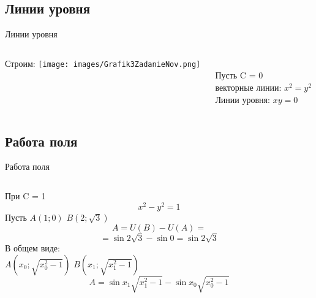 
\subsection{Линии уровня}
\begin{frame}{Линии уровня}
\begin{columns}
\begin{column}{0.4\paperwidth}
\centering
Строим:
\vspace{5mm}
\texttt{[image: images/Grafik3ZadanieNov.png]}
\end{column}
\begin{column}{0.4\paperwidth}
\centering
\vspace{20mm} \\
Пусть C = 0 \\
векторные линии: $x^2 = y^2$ \\
Линии уровня: $xy = 0$
\end{column}
\end{columns}
\end{frame}

\subsection{Работа поля}
\begin{frame}{Работа поля}
\begin{columns}
\begin{column}{0.4\paperwidth}
\centering 
 При C = 1 
$$
x^2 - y^2 = 1
$$
\centering
Пусть $A(1;0)$\hspace{1mm} $B(2;\sqrt{3})$ \\
$$
A = U(B) - U(A) = 
$$
$$
= \sin{2\sqrt{3}} - \sin{0} = \sin{2\sqrt{3}}
$$
В общем виде: \\
$A(x_0; \sqrt{x_0^{2} - 1})$ \hspace{1mm} $B(x_1; \sqrt{x_1^{2} - 1})$
$$
A = \sin{x_1\sqrt{x_1^{2} - 1}} - \sin{x_0\sqrt{x_0^{2} - 1}}
$$
\end{column}
\end{columns}
\end{frame}
